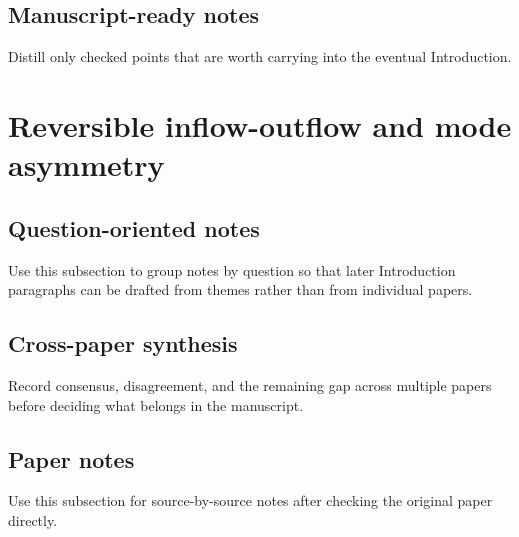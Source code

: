\documentclass[11pt]{article}
\begin{document}
\subsection{Manuscript-ready notes}
Distill only checked points that are worth carrying into the eventual Introduction.

\section{Reversible inflow-outflow and mode asymmetry}

\subsection{Question-oriented notes}
Use this subsection to group notes by question so that later Introduction paragraphs can be drafted from themes rather than from individual papers.

\subsection{Cross-paper synthesis}
Record consensus, disagreement, and the remaining gap across multiple papers before deciding what belongs in the manuscript.

\subsection{Paper notes}
Use this subsection for source-by-source notes after checking the original paper directly.
%
\end{document}
